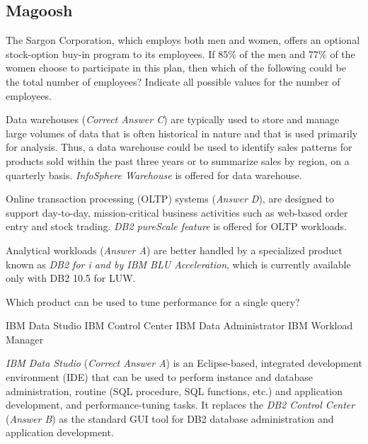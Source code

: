 \documentclass[answers, 11pt]{exam}
\begin{document}
\begin{questions}

\section{Magoosh}
\question[1]
The Sargon Corporation, which employs both men and women, offers an optional stock-option buy-in program to its employees. If 85\% of the men and 77\% of the women choose to participate in this plan, then which of the following could be the total number of employees? Indicate all possible values for the number of employees.
\begin{choices}
\end{choices}

\begin{solution}
Data warehouses (\textit{Correct Answer C}) are typically used to store and manage large volumes of data that is often
historical in nature and that is used primarily for analysis. Thus, a data warehouse could be used to identify sales patterns
for products sold within the past three years or to summarize sales by region, on a quarterly basis. \textit{InfoSphere Warehouse} is offered for data warehouse.
\par

Online transaction processing (OLTP) systems (\textit{Answer D}), are designed to support day-to-day, mission-critical business
activities such as web-based order entry and stock trading. \textit{DB2 pureScale feature} is offered for OLTP workloads. 
\par

{\color{red} Analytical} workloads (\textit{Answer A}) are better handled by a specialized product
known as \textit{DB2 for i and by IBM BLU Acceleration}, which is currently available
only with DB2 10.5 for LUW.

\end{solution}

\question[1]
Which product can be used to tune performance for a single query?
\begin{choices}
\CorrectChoice IBM Data Studio
\choice IBM Control Center
\choice IBM Data Administrator
\choice IBM Workload Manager
\end{choices}

\begin{solution}
\textit{IBM Data Studio} (\textit{Correct Answer A}) is an Eclipse-based, integrated
development environment (IDE) that can be used to perform instance and database
administration, routine (SQL procedure, SQL functions, etc.) and application
development, and performance-tuning tasks. It replaces the \textit{DB2 Control Center} 
(\textit{Answer B}) as the standard GUI tool for DB2 database administration and
application development.
\par


\end{solution}
\end{questions}
\end{document}
